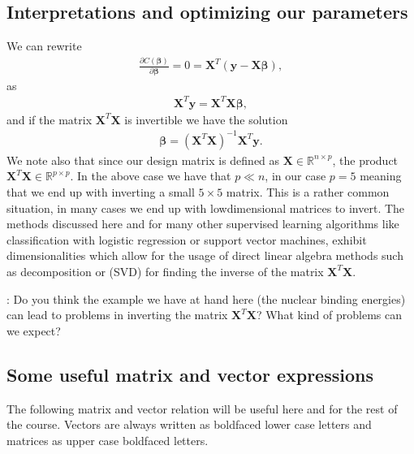 \documentclass[letterpaper,10pt,english]{sphinxmanual}
\begin{document}
\subsection{Interpretations and optimizing our parameters}
\label{\detokenize{chapter4:id2}}
We can rewrite
\begin{equation*}
\begin{split}
\frac{\partial C(\boldsymbol{\beta})}{\partial \boldsymbol{\beta}} = 0 = \boldsymbol{X}^T\left( \boldsymbol{y}-\boldsymbol{X}\boldsymbol{\beta}\right),
\end{split}
\end{equation*}
as
\begin{equation*}
\begin{split}
\boldsymbol{X}^T\boldsymbol{y} = \boldsymbol{X}^T\boldsymbol{X}\boldsymbol{\beta},
\end{split}
\end{equation*}
and if the matrix \(\boldsymbol{X}^T\boldsymbol{X}\) is invertible we have the solution
\begin{equation*}
\begin{split}
\boldsymbol{\beta} =\left(\boldsymbol{X}^T\boldsymbol{X}\right)^{-1}\boldsymbol{X}^T\boldsymbol{y}.
\end{split}
\end{equation*}
We note also that since our design matrix is defined as \(\boldsymbol{X}\in
{\mathbb{R}}^{n\times p}\), the product \(\boldsymbol{X}^T\boldsymbol{X} \in
{\mathbb{R}}^{p\times p}\).  In the above case we have that \(p \ll n\),
in our case \(p=5\) meaning that we end up with inverting a small
\(5\times 5\) matrix. This is a rather common situation, in many cases we end up with low\sphinxhyphen{}dimensional
matrices to invert. The methods discussed here and for many other
supervised learning algorithms like classification with logistic
regression or support vector machines, exhibit dimensionalities which
allow for the usage of direct linear algebra methods such as  decomposition or  (SVD) for finding the inverse of the matrix
\(\boldsymbol{X}^T\boldsymbol{X}\).

: Do you think the example we have at hand here (the nuclear binding energies) can lead to problems in inverting the matrix  \(\boldsymbol{X}^T\boldsymbol{X}\)? What kind of problems can we expect?


\subsection{Some useful matrix and vector expressions}
\label{\detokenize{chapter4:some-useful-matrix-and-vector-expressions}}
The following matrix and vector relation will be useful here and for the rest of the course. Vectors are always written as boldfaced lower case letters and
matrices as upper case boldfaced letters.
\end{document}
